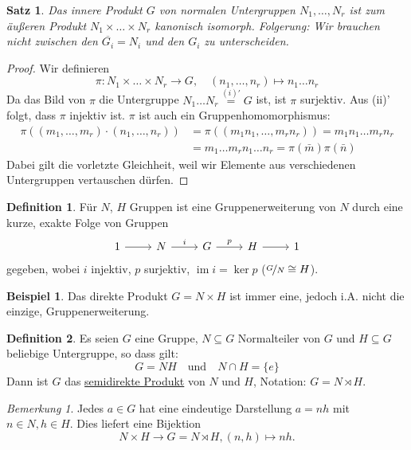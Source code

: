 \documentclass[12pt]{scrartcl} %
\DeclareMathOperator{\im}{im}
\newtheorem{thm}{Satz}
\theoremstyle{definition}
\newtheorem*{defn}{Definition}
\newtheorem{ex}{Beispiel}
\theoremstyle{remark}
\newtheorem*{nb}{Bemerkung}
\begin{document}
\begin{thm}
	Das innere Produkt $G$ von normalen Untergruppen $N_1,\dots,N_r$ ist zum äußeren Produkt $N_1\times\dots \times N_r$ kanonisch isomorph.
	Folgerung: Wir brauchen nicht zwischen den $\overline{G_i}=N_i$ und den $G_i$ zu unterscheiden.
\end{thm}

\begin{proof}
	Wir definieren $$\pi: N_1\times\dots\times N_r \longrightarrow G,\quad (n_1,\dots,n_r)\mapsto n_1\dots n_r$$
	Da das Bild von $\pi$ die Untergruppe $N_1\dots N_r \overset{(i)'}{=} G$ ist, ist $\pi$ surjektiv.
	Aus (ii)' folgt, dass $\pi$ injektiv ist.
	$\pi$ ist auch ein Gruppenhomomorphismus:
	\begin{align*}
		\pi((m_1,\dots,m_r)\cdot (n_1,\dots,n_r)) &= \pi((m_1n_1,\dots,m_rn_r)) = m_1n_1\dots m_rn_r\\
		&= m_1\dots m_rn_1\dots n_r = \pi(\bar m)\pi(\bar n)
	\end{align*}
	Dabei gilt die vorletzte Gleichheit, weil wir Elemente aus verschiedenen Untergruppen vertauschen dürfen.
\end{proof}

\begin{defn}
	Für \(N\), \(H\) Gruppen ist eine Gruppenerweiterung von $N$ durch eine kurze, exakte Folge von Gruppen
	\[ \begin{tikzcd}
		1 \arrow[r] & N \arrow[r, "i"] & G \arrow[r, "p"] & H \arrow[r] & 1
	\end{tikzcd} \]
	gegeben, wobei $i$ injektiv, $p$ surjektiv, $\im i = \ker p$ ($\nicefrac{G}{N} \cong H$).
\end{defn}

\begin{ex}
	Das direkte Produkt $G=N\times H$ ist immer eine, jedoch i.A. nicht die einzige, Gruppenerweiterung.
\end{ex}

\begin{defn}
	Es seien $G$ eine Gruppe, $N\subseteq G$ Normalteiler von $G$ und $H\subseteq G$ beliebige Untergruppe, so dass gilt:
	$$G=NH \quad \text{und} \quad N\cap H = \{e\}$$
	Dann ist $G$ das \underline{semidirekte Produkt} von $N$ und $H$, Notation: $G=N\rtimes H$.
\end{defn}

\begin{nb}
	Jedes $a\in G$ hat eine eindeutige Darstellung $a=nh$ mit $n\in N, h\in H$.
	Dies liefert eine Bijektion $$N\times H \to G=N\rtimes H, (n,h)\mapsto nh.$$
\end{nb}
\end{document}
